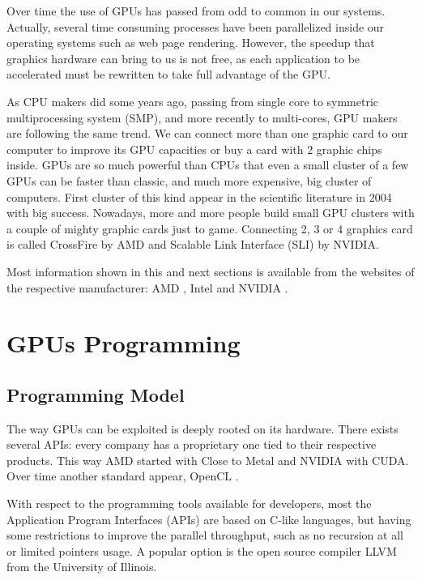 \documentclass[review]{elsarticle}
\begin{document}
Over time the use of GPUs has passed from odd to common in our
systems. Actually, several time consuming processes have been
parallelized inside our operating systems such as web page
rendering. However, the speedup that graphics hardware can bring to us
is not free, as each application to be accelerated must be rewritten
to take full advantage of the GPU.

As CPU makers did some years ago, passing from single core to symmetric multiprocessing system (SMP), and more recently to multi-cores, GPU makers are following the same trend. We can connect more than one graphic card to our computer to improve its GPU capacities or buy a card with 2 graphic chips inside. GPUs are so much powerful than CPUs that even a small cluster of a few GPUs can be faster than classic, and much more expensive, big cluster of computers. First cluster of this kind appear in the scientific literature in 2004 \cite{10.1109/SC.2004.26} with big success. Nowadays, more and more people build small GPU clusters with a couple of mighty graphic cards just to game. Connecting 2, 3 or 4 graphics card is called CrossFire by AMD and Scalable Link Interface (SLI) by NVIDIA.

Most information shown in this and next sections is available from the websites of the respective manufacturer: AMD \cite{amd}, Intel \cite{intel} and NVIDIA \cite{nvidia}.

\section{GPUs Programming}
\label{sec:programming}

\subsection{Programming Model}

The way GPUs can be exploited is deeply rooted on its hardware. There exists several APIs: every company has a proprietary one tied to their respective products. This way AMD started with Close to Metal and NVIDIA with CUDA. Over time another standard appear, OpenCL \cite{opencl}.

With respect to the programming tools available for developers, most the Application Program Interfaces (APIs) are based on C-like languages, but having some restrictions to improve the parallel throughput, such as no recursion at all or limited pointers usage. A popular option is the open source compiler LLVM \cite{LLVM} from the University of Illinois.
\end{document}
